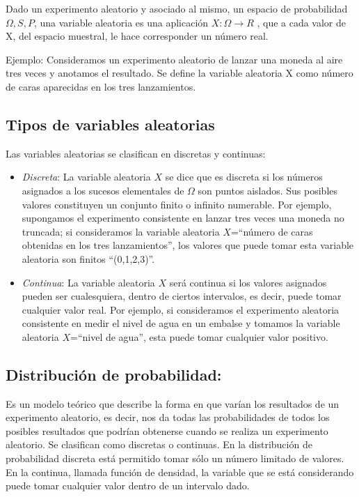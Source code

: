 \documentclass[
  12pt,
]{krantz}
\theoremstyle{definition}
\theoremstyle{definition}
\theoremstyle{definition}
\theoremstyle{remark}
\let\BeginKnitrBlock\begin \let\EndKnitrBlock\end
\begin{document}
\BeginKnitrBlock{definition}
\protect\hypertarget{def:defi-var-alea}{}{\label{def:defi-var-alea} }Dado un experimento aleatorio y asociado al mismo, un espacio de probabilidad \(\Omega, S, P\), una variable aleatoria es una aplicación \(X : \Omega → R\) , que a cada valor de X, del espacio muestral, le hace corresponder un número real.
\EndKnitrBlock{definition}

Ejemplo: Consideramos un experimento aleatorio de lanzar una moneda al aire tres veces y anotamos el resultado. Se define la variable aleatoria X como número de caras aparecidas en los tres lanzamientos.

\hypertarget{tipos-de-variables-aleatorias}{%
\subsection{Tipos de variables aleatorias}\label{tipos-de-variables-aleatorias}}

Las variables aleatorias se clasifican en discretas y continuas:

\begin{itemize}
\item
  \emph{Discreta}: La variable aleatoria \(X\) se dice que es discreta si los números asignados a los sucesos elementales de \(\Omega\) son puntos aislados. Sus posibles valores constituyen un conjunto finito o infinito numerable. Por ejemplo, supongamos el experimento consistente en lanzar tres veces una moneda no truncada; si consideramos la variable aleatoria \(X\)=``número de caras obtenidas en los tres lanzamientos'', los valores que puede tomar esta variable aleatoria son finitos ``(0,1,2,3)''.
\item
  \emph{Continua}: La variable aleatoria \(X\) será continua si los valores asignados pueden ser cualesquiera, dentro de ciertos intervalos, es decir, puede tomar cualquier valor real. Por ejemplo, si consideramos el experimento aleatoria consistente en medir el nivel de agua en un embalse y tomamos la variable aleatoria \(X\)=``nivel de agua'', esta puede tomar cualquier valor positivo.
\end{itemize}

\hypertarget{distribucion-de-probabilidad}{%
\subsection{Distribución de probabilidad:}\label{distribucion-de-probabilidad}}

Es un modelo teórico que describe la forma en que varían los resultados de un experimento aleatorio, es decir, nos da todas las probabilidades de todos los posibles resultados que podrían obtenerse cuando se realiza un experimento aleatorio. Se clasifican como discretas o continuas. En la distribución de probabilidad discreta está permitido tomar sólo un número limitado de valores. En la continua, llamada función de densidad, la variable que se está considerando puede tomar cualquier valor dentro de un intervalo dado.
\end{document}

